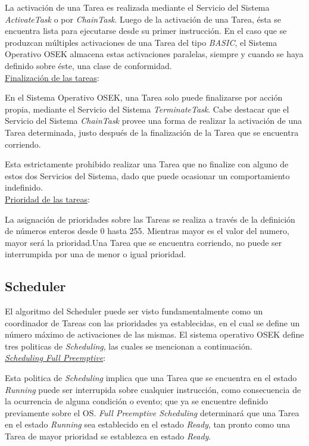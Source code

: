 \documentclass[12pt,letterpaper]{article}
\begin{document}
La activación de una Tarea es realizada mediante el Servicio del Sistema \textit{ActivateTask} o por \textit{ChainTask}\cite{os223}. Luego de la activación de una Tarea, ésta se encuentra lista para ejecutarse desde su primer instrucción. En el caso que se produzcan múltiples activaciones de una Tarea del tipo \textit{BASIC}, el Sistema Operativo OSEK almacena estas activaciones paralelas, siempre y cuando se haya definido sobre éste, una clase de conformidad.\\
\underline{Finalización de las tareas}:

En el Sistema Operativo OSEK, una Tarea solo puede finalizarse por acción propia, mediante el Servicio del Sistema \textit{TerminateTask}. Cabe destacar que el Servicio del Sistema \textit{ChainTask} provee una forma de realizar la activación de una Tarea determinada, justo después de la finalización de la Tarea que se encuentra corriendo.

Esta estrictamente prohibido realizar una Tarea que no finalize con alguno de estos dos Servicios del Sistema, dado que puede ocasionar un comportamiento indefinido.\\
\underline{Prioridad de las tareas}:

La asignación de prioridades sobre las Tareas se realiza a través de la definición de números enteros desde 0 hasta 255\cite{libroosekcerdeiro}. Mientras mayor es el valor del numero, mayor será la prioridad.Una Tarea que se encuentra corriendo, no puede ser interrumpida por una de menor o igual prioridad.
\subsection{Scheduler}\label{sec:scheduler}
El algoritmo del Scheduler puede ser visto fundamentalmente como un coordinador de Tareas con las prioridades ya establecidas, en el cual se define un número máximo de activaciones de las mismas. El sistema operativo OSEK define tres politicas de \textit{Scheduling}, las cuales se mencionan a continuación.\\
\underline{\textit{Scheduling Full Preemptive}}:

Esta politica de \textit{Scheduling} implica que una Tarea que se encuentra en el estado \textit{Running} puede ser interrupida sobre cualquier instrucción, como consecuencia de la ocurrencia de alguna condición o evento; que ya se encuentre definido previamente sobre el OS. \textit{Full Preemptive Scheduling} determinará que una Tarea en el estado \textit{Running} sea establecido en el estado \textit{Ready}, tan pronto como una Tarea de mayor prioridad se establezca en estado \textit{\textit{Ready}}.
\end{document}
